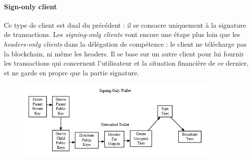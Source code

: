 \documentclass[11pt,a4paper]{article}
\begin{document}
\paragraph{Sign-only client}
Ce type de client est dual du précédent : il se consacre uniquement à la signature de transactions.
Les \textit{signing-only clients} vont encore une étape plus loin que les \textit{headers-only clients} dans la délégation de compétence : le client ne télécharge pas la blockchain, ni même les headers. Il se base sur un autre client pour lui fournir les transactions qui concernent l'utilisateur et la situation financière de ce dernier, et ne garde en propre que la partie signature.
\begin{figure}[h]
	\centering
	\includegraphics[width=10cm]{en-wallets-signing-only}
\end{figure}
\end{document}
